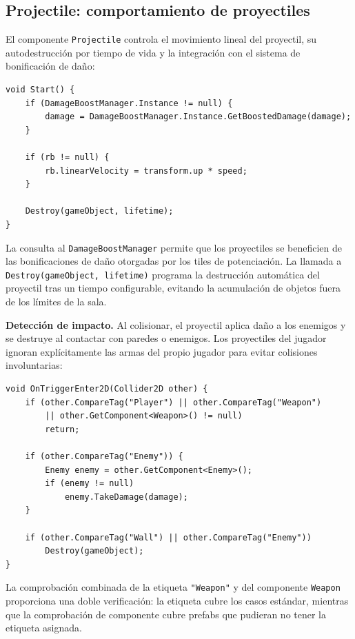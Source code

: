 \subsection{Projectile: comportamiento de proyectiles}


El componente \texttt{Projectile} controla el movimiento lineal del proyectil, su autodestrucción por tiempo de vida y la integración con el sistema de bonificación de daño:

\begin{lstlisting}
void Start() {
    if (DamageBoostManager.Instance != null) {
        damage = DamageBoostManager.Instance.GetBoostedDamage(damage);
    }
    
    if (rb != null) {
        rb.linearVelocity = transform.up * speed;
    }
    
    Destroy(gameObject, lifetime);
}
\end{lstlisting}


La consulta al \texttt{DamageBoostManager} permite que los proyectiles se beneficien de las bonificaciones de daño otorgadas por los tiles de potenciación. La llamada a \texttt{Destroy(gameObject, lifetime)} programa la destrucción automática del proyectil tras un tiempo configurable, evitando la acumulación de objetos fuera de los límites de la sala.

\textbf{Detección de impacto.} Al colisionar, el proyectil aplica daño a los enemigos y se destruye al contactar con paredes o enemigos. Los proyectiles del jugador ignoran explícitamente las armas del propio jugador para evitar colisiones involuntarias:

\begin{lstlisting}
void OnTriggerEnter2D(Collider2D other) {
    if (other.CompareTag("Player") || other.CompareTag("Weapon")
        || other.GetComponent<Weapon>() != null)
        return;
    
    if (other.CompareTag("Enemy")) {
        Enemy enemy = other.GetComponent<Enemy>();
        if (enemy != null)
            enemy.TakeDamage(damage);
    }
    
    if (other.CompareTag("Wall") || other.CompareTag("Enemy"))
        Destroy(gameObject);
}
\end{lstlisting}


La comprobación combinada de la etiqueta \texttt{"Weapon"} y del componente \texttt{Weapon} proporciona una doble verificación: la etiqueta cubre los casos estándar, mientras que la comprobación de componente cubre prefabs que pudieran no tener la etiqueta asignada.

